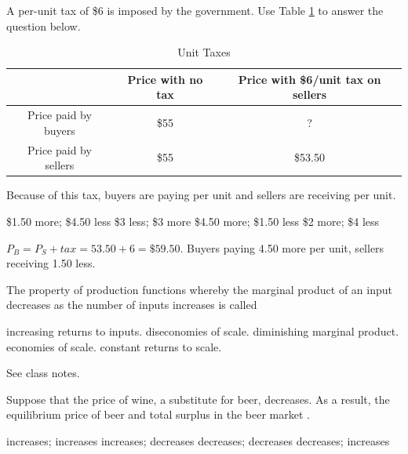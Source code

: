\documentclass[addpoints,11pt]{exam}
\theoremstyle{definition}
\newcommand{\blank}[0]{\underline{\hspace{3cm}}}
\begin{document}
\begin{questions}
	\question A per-unit tax of \$6 is imposed by the government. Use Table \ref{MC27} to answer the question below.
	
	\begin{table}[h!]
		\caption{Unit Taxes}
		\centering
		\begin{tabular}{ c|c|c} 
			
			& Price with no tax & Price with \$6/unit tax on sellers \\
			\hline
			Price paid by buyers & \$55 & ? \\
			Price paid by sellers & \$55 & \$53.50  \\
		\end{tabular}
		\label{MC27}
	\end{table}

Because of this tax, buyers are paying \blank per unit and sellers are receiving \blank per unit.

	\begin{choices}
		\choice \$1.50 more; \$4.50 less
		\choice \$3 less; \$3 more
		\CorrectChoice \$4.50 more; \$1.50 less
		\choice \$2 more; \$4 less
	\end{choices}
	
	\begin{solution}
		$P_B = P_S + tax = 53.50 + 6 = \$59.50$. Buyers paying 4.50 more per unit, sellers receiving 1.50 less.
	\end{solution}
	
	\question The property of production functions whereby the marginal product of an input decreases as the number of inputs increases is called 
	
	
	\begin{choices}
		\choice increasing returns to inputs.
		\choice diseconomies of scale.
		\CorrectChoice diminishing marginal product.
		\choice economies of scale.
		\choice constant returns to scale.
	\end{choices}
	
	\begin{solution}
		See class notes. 
	\end{solution}
	
\newpage


		
\question Suppose that the price of wine, a substitute for beer, decreases. As a result, the equilibrium price of beer \blank and total surplus in the beer market \blank. 

\begin{choices}
	\choice increases; increases
	\choice increases; decreases
	\CorrectChoice decreases; decreases
	\choice decreases; increases
\end{choices}


\end{questions}
\end{document}
